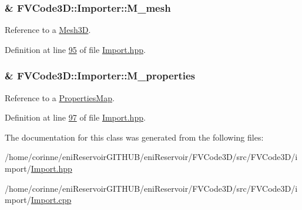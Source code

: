 \subsubsection[{\texorpdfstring{M\+\_\+mesh}{M_mesh}}]{\& F\+V\+Code3\+D\+::\+Importer\+::\+M\+\_\+mesh\hspace{0.3cm}{\ttfamily [protected]}}\hypertarget{classFVCode3D_1_1Importer_a6f1542d6c6ac192e36c8eec7dc366653}{}\label{classFVCode3D_1_1Importer_a6f1542d6c6ac192e36c8eec7dc366653}


Reference to a \hyperlink{classFVCode3D_1_1Mesh3D}{Mesh3D}. 



Definition at line \hyperlink{Import_8hpp_source_l00095}{95} of file \hyperlink{Import_8hpp_source}{Import.\+hpp}.

\subsubsection[{\texorpdfstring{M\+\_\+properties}{M_properties}}]{\& F\+V\+Code3\+D\+::\+Importer\+::\+M\+\_\+properties\hspace{0.3cm}{\ttfamily [protected]}}\hypertarget{classFVCode3D_1_1Importer_af678e18e971d5a132f5ba494981f6dae}{}\label{classFVCode3D_1_1Importer_af678e18e971d5a132f5ba494981f6dae}


Reference to a \hyperlink{classFVCode3D_1_1PropertiesMap}{Properties\+Map}. 



Definition at line \hyperlink{Import_8hpp_source_l00097}{97} of file \hyperlink{Import_8hpp_source}{Import.\+hpp}.



The documentation for this class was generated from the following files\+:\begin{DoxyCompactItemize}
\item 
/home/corinne/eni\+Reservoir\+G\+I\+T\+H\+U\+B/eni\+Reservoir/\+F\+V\+Code3\+D/src/\+F\+V\+Code3\+D/import/\hyperlink{Import_8hpp}{Import.\+hpp}\item 
/home/corinne/eni\+Reservoir\+G\+I\+T\+H\+U\+B/eni\+Reservoir/\+F\+V\+Code3\+D/src/\+F\+V\+Code3\+D/import/\hyperlink{Import_8cpp}{Import.\+cpp}\end{DoxyCompactItemize}
